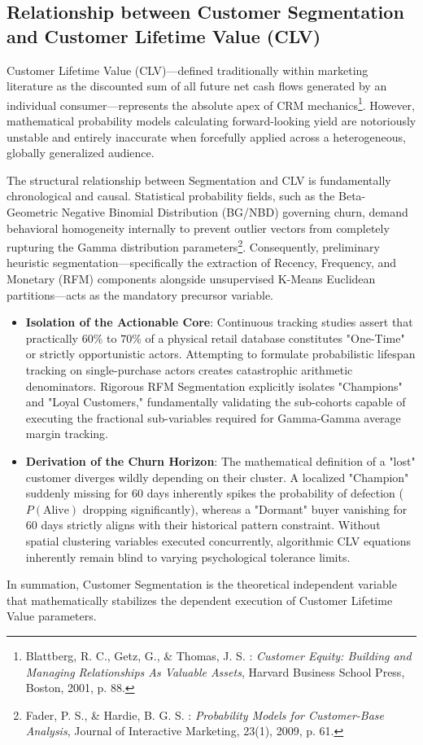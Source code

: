 \documentclass[12pt,a4paper]{report}
\begin{document}
\subsection{Relationship between Customer Segmentation and Customer Lifetime Value (CLV)}
Customer Lifetime Value (CLV)—defined traditionally within marketing literature as the discounted sum of all future net cash flows generated by an individual consumer—represents the absolute apex of CRM mechanics\footnote{Blattberg, R. C., Getz, G., \& Thomas, J. S. : \textit{Customer Equity: Building and Managing Relationships As Valuable Assets}, Harvard Business School Press, Boston, 2001, p. 88.}. However, mathematical probability models calculating forward-looking yield are notoriously unstable and entirely inaccurate when forcefully applied across a heterogeneous, globally generalized audience. 

The structural relationship between Segmentation and CLV is fundamentally chronological and causal. Statistical probability fields, such as the Beta-Geometric Negative Binomial Distribution (BG/NBD) governing churn, demand behavioral homogeneity internally to prevent outlier vectors from completely rupturing the Gamma distribution parameters\footnote{Fader, P. S., \& Hardie, B. G. S. : \textit{Probability Models for Customer-Base Analysis}, Journal of Interactive Marketing, 23(1), 2009, p. 61.}. Consequently, preliminary heuristic segmentation—specifically the extraction of Recency, Frequency, and Monetary (RFM) components alongside unsupervised K-Means Euclidean partitions—acts as the mandatory precursor variable.

\begin{itemize}
    \item \textbf{Isolation of the Actionable Core}: Continuous tracking studies assert that practically $60\%$ to $70\%$ of a physical retail database constitutes "One-Time" or strictly opportunistic actors. Attempting to formulate probabilistic lifespan tracking on single-purchase actors creates catastrophic arithmetic denominators. Rigorous RFM Segmentation explicitly isolates "Champions" and "Loyal Customers," fundamentally validating the sub-cohorts capable of executing the fractional sub-variables required for Gamma-Gamma average margin tracking.
    \item \textbf{Derivation of the Churn Horizon}: The mathematical definition of a "lost" customer diverges wildly depending on their cluster. A localized "Champion" suddenly missing for 60 days inherently spikes the probability of defection ($P(\text{Alive})$ dropping significantly), whereas a "Dormant" buyer vanishing for 60 days strictly aligns with their historical pattern constraint. Without spatial clustering variables executed concurrently, algorithmic CLV equations inherently remain blind to varying psychological tolerance limits.
\end{itemize}
In summation, Customer Segmentation is the theoretical independent variable that mathematically stabilizes the dependent execution of Customer Lifetime Value parameters.
\end{document}
